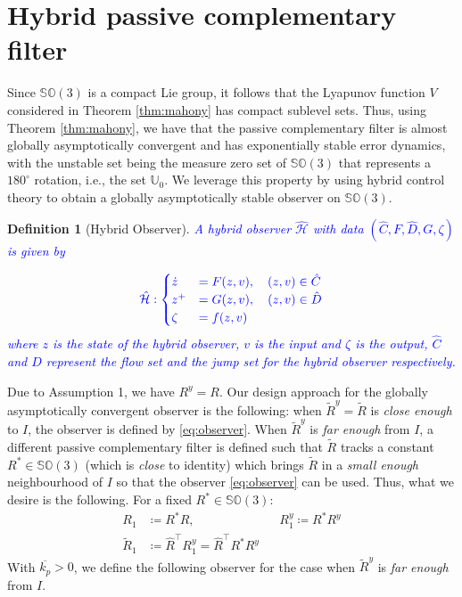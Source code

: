 \documentclass{article}
\newcommand{\SOthree}{\mathbb{SO}(3)}
\newtheorem{definition}{Definition}
\newcommand{\textblue}[1]{\textcolor{blue}{#1}}
\newcommand{\Rtilde}{\tilde{R}}
\newcommand{\Rstar}{{R^*}}
\begin{document}

\section{Hybrid passive complementary filter}

{Since $\SOthree$ is a compact Lie group, it follows that the Lyapunov function $V$ considered in Theorem \ref{thm:mahony} has compact sublevel sets.} Thus, using Theorem \ref{thm:mahony}, we have that the passive complementary filter is almost globally asymptotically convergent and has exponentially stable error dynamics, with the unstable set being the measure zero set of $\SOthree$ that represents a $180^\circ$ rotation, i.e., the set $\mathbb{U}_0$. We leverage this property by using hybrid control theory to obtain a globally asymptotically stable observer on $\SOthree$. 

\begin{definition}[Hybrid Observer]
    \textblue{A hybrid observer $\hat{\mathcal{H}}$ with data $(\hat{C}, F, \hat{D}, G, \zeta)$ is given by}

\begin{alignat}{3}
    \textblue{\hat{\mathcal{H}} :  \begin{cases}
        \dot{z} &= F(z, v), \quad (z, v) \in \hat{C}\\
        z^+ &= G(z, v), \quad (z, v)\in \hat{D}\\
        \zeta &= f(z, v)
    \end{cases}}
\end{alignat}
\textblue{where $z$ is the state of the hybrid observer, $v$ is the input and $\zeta$ is the output, $\hat{C}$ and $\hat{D}$ represent the flow set and the jump set for the hybrid observer respectively. }
\end{definition}

Due to Assumption 1, we have $R^y = R$. Our design approach for the globally asymptotically convergent observer is the following: when {$\Rtilde^y = \Rtilde$} is \emph{close enough} to $I$, the observer is defined by \eqref{eq:observer}. When ${\Rtilde^y}$ is \emph{far enough} from $I$, a different passive complementary filter is defined such that $\Rtilde$ tracks a constant $\Rstar\in\SOthree$ (which is \emph{close} to identity) which brings $\Rtilde$ in a \emph{small enough} neighbourhood of $I$ so that the observer \eqref{eq:observer} can be used. Thus, what we desire is the following. For a fixed $\Rstar\in \SOthree$:
\begin{subequations}
\begin{align}
    R_1 &\coloneqq \Rstar R, && R_1^y \coloneqq \Rstar R^y\\
    \Rtilde_1 &\coloneqq \hat{R}^\top R^y_1 = \hat{R}^\top \Rstar R^y
\end{align}
\end{subequations}
With $\overline{k_p}>0$, we define the following observer for the case when $\Rtilde^y$ is \emph{far enough} from $I$. 
\end{document}
